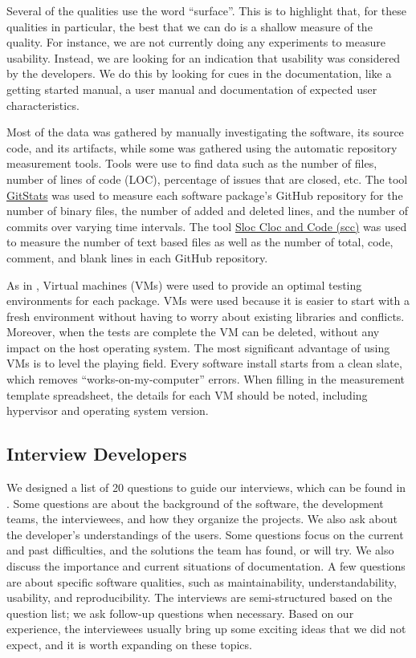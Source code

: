 \documentclass[final, 3p, times, authoryear]{elsarticle}
\begin{document}
Several of the qualities use the word ``surface''.  This is to highlight that,
for these qualities in particular, the best that we can do is a shallow measure
of the quality.  For instance, we are not currently doing any experiments to
measure usability.  Instead, we are looking for an indication that usability was
considered by the developers.  We do this by looking for cues in the
documentation, like a getting started manual, a user manual and documentation of
expected user characteristics.

Most of the data was gathered by manually investigating the software, its source
code, and its artifacts, while some was gathered using the automatic repository
measurement tools.  Tools were use to find data such as the number of files,
number of lines of code (LOC), percentage of issues that are closed, etc. The
tool \href{https://github.com/tomgi/git_stats}{GitStats} was used to measure
each software package's GitHub repository for the number of binary files, the
number of added and deleted lines, and the number of commits over varying time
intervals. The tool \href{https://github.com/boyter/scc}{Sloc Cloc and Code
(scc)} was used to measure the number of text based files as well as the number
of total, code, comment, and blank lines in each GitHub repository.

As in \citet{SmithEtAl2016}, Virtual machines (VMs) were used to provide an
optimal testing environments for each package. VMs were used because it is
easier to start with a fresh environment without having to worry about existing
libraries and conflicts. Moreover, when the tests are complete the VM can be
deleted, without any impact on the host operating system. The most significant
advantage of using VMs is to level the playing field. Every software install
starts from a clean slate, which removes ``works-on-my-computer'' errors. When
filling in the measurement template spreadsheet, the details for each VM
should be noted, including hypervisor and operating system version.

\subsection{Interview Developers} \label{SecSurvey}

We designed a list of 20 questions to guide our interviews, which can be found
in \citet{SmithEtAl2021}. Some questions are about the background of the
software, the development teams, the interviewees, and how they organize the
projects. We also ask about the developer's understandings of the users. Some
questions focus on the current and past difficulties, and the solutions the team
has found, or will try. We also discuss the importance and current situations of
documentation. A few questions are about specific software qualities, such as
maintainability, understandability, usability, and reproducibility. The
interviews are semi-structured based on the question list; we ask follow-up
questions when necessary. Based on our experience, the interviewees usually
bring up some exciting ideas that we did not expect, and it is worth expanding
on these topics.
\end{document}
